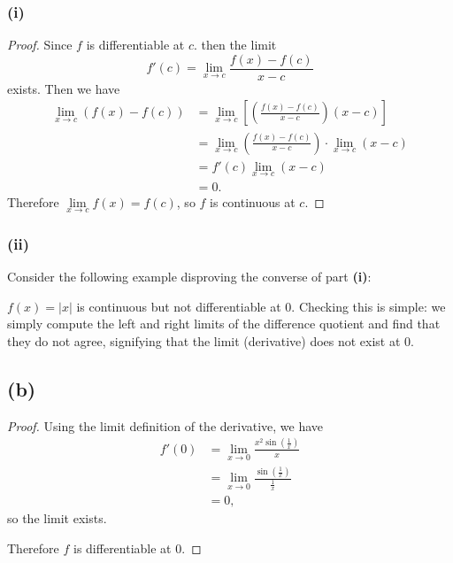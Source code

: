 \documentclass{article}
\begin{document}
\subsubsection*{(i)}
\begin{proof}
	Since $f$ is differentiable at $c$. then the limit
	\begin{equation}
		f'(c) = \lim\limits_{x \to c} \frac{f(x) - f(c)}{x - c}
	\end{equation}
	exists. Then we have
	\begin{align}
		\lim\limits_{x \to c} \left(f(x) - f(c)\right) &= \lim\limits_{x \to c} \left[\left(\frac{f(x) - f(c)}{x-c}\right)(x - c)\right] \\
		&= \lim\limits_{x \to c} \left(\frac{f(x) - f(c)}{x - c}\right) \cdot \lim\limits_{x \to c} (x - c) \\
		&= f'(c) \lim\limits_{x \to c} (x - c) \\
		&= 0.
	\end{align}
	Therefore $\lim\limits_{x \to c} f(x) = f(c)$, so $f$ is continuous at $c$.
\end{proof}

\subsubsection*{(ii)} 
Consider the following example disproving the converse of part \textbf{(i)}:

$f(x) = |x|$ is continuous but not differentiable at $0$. Checking this is simple: we simply compute the left and right limits of the difference quotient and find that they do not agree, signifying that the limit (derivative) does not exist at $0$. 

\subsection*{(b)}
\begin{proof}
	Using the limit definition of the derivative, we have
	\begin{align}
		f'(0) &= \lim\limits_{x \to 0} \frac{x^2 \sin\left(\frac{1}{x}\right)}{x} \\
		&= \lim\limits_{x \to 0} \frac{\sin\left(\frac{1}{x}\right)}{\frac{1}{x}} \\
		&= 0,
	\end{align}
	so the limit exists.
	
	Therefore $f$ is differentiable at $0$. 
\end{proof}
\end{document}
